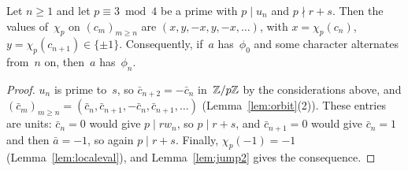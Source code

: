 \begin{lemma}
  \label{lem:period2}
  \leanok
  Let $n \ge 1$ and let $p \equiv 3 \bmod 4$ be a prime with $p \mid u_n$ and $p \nmid r + s$.
  Then the values of~$\chi_p$ on $(c_m)_{m \ge n}$ are $(x, y, -x, y, -x, \dots)$, with
  $x = \chi_p(c_n)$, $y = \chi_p(c_{n+1}) \in \{\pm 1\}$. Consequently, if~$a$ has~$\phi_0$
  and some character alternates from~$n$ on, then~$a$ has~$\phi_n$.
\end{lemma}
\begin{proof}
  \leanok
  $u_n$ is prime to~$s$, so $\bar c_{n+2} = -\bar c_n$ in~$\mathbb{Z}/p\mathbb{Z}$ by the considerations above,
  and $(\bar c_m)_{m \ge n} = (\bar c_n, \bar c_{n+1}, -\bar c_n, \bar c_{n+1}, \dots)$
  (Lemma~\ref{lem:orbit}(2)). These entries are units: $\bar c_n = 0$ would give $p \mid r w_n$,
  so $p \mid r + s$, and $\bar c_{n+1} = 0$ would give $\bar c_n = 1$ and then $\bar a = -1$, so
  again $p \mid r + s$. Finally, $\chi_p(-1) = -1$ (Lemma~\ref{lem:localeval}), and
  Lemma~\ref{lem:jump2} gives the consequence.
\end{proof}

